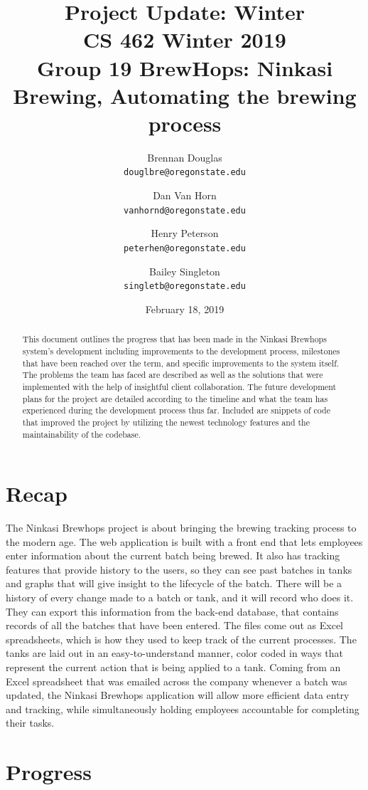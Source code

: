\documentclass[draftclsnofoot,onecolumn,journal,letterpaper,compsoc,10pt]{IEEEtran}
\title{Project Update: Winter\\\large CS 462 Winter 2019\\Group 19 BrewHops: Ninkasi Brewing, Automating the brewing process}
\author{
    Brennan Douglas \\
    \texttt{douglbre@oregonstate.edu} \\
    \and
    Dan Van Horn \\
    \texttt{vanhornd@oregonstate.edu} \\
    \and
    Henry Peterson \\
    \texttt{peterhen@oregonstate.edu} \\
    \and
    Bailey Singleton \\
    \texttt{singletb@oregonstate.edu} \\
}
\date{February 18, 2019}
\begin{document}
\begin{titlingpage}
    \maketitle
    \begin{abstract}
This document outlines the progress that has been made in the Ninkasi Brewhops system's development including improvements to the development process, milestones that have been reached over the term, and specific improvements to the system itself. The problems the team has faced are described as well as the solutions that were implemented with the help of insightful client collaboration. The future development plans for the project are detailed according to the timeline and what the team has experienced during the development process thus far. Included are snippets of code that improved the project by utilizing the newest technology features and the maintainability of the codebase.
    \end{abstract}
    \pagebreak
    \tableofcontents
\end{titlingpage}

\section{Recap}

The Ninkasi Brewhops project is about bringing the brewing tracking process to the modern age. The web application is built with a front end that lets employees enter information about the current batch being brewed. It also has tracking features that provide history to the users, so they can see past batches in tanks and graphs that will give insight to the lifecycle of the batch. There will be a history of every change made to a batch or tank, and it will record who does it. They can export this information from the back-end database, that contains records of all the batches that have been entered. The files come out as Excel spreadsheets, which is how they used to keep track of the current processes. The tanks are laid out in an easy-to-understand manner, color coded in ways that represent the current action that is being applied to a tank. Coming from an Excel spreadsheet that was emailed across the company whenever a batch was updated, the Ninkasi Brewhops application will allow more efficient data entry and tracking, while simultaneously holding employees accountable for completing their tasks. 


\section{Progress}
\end{document}
